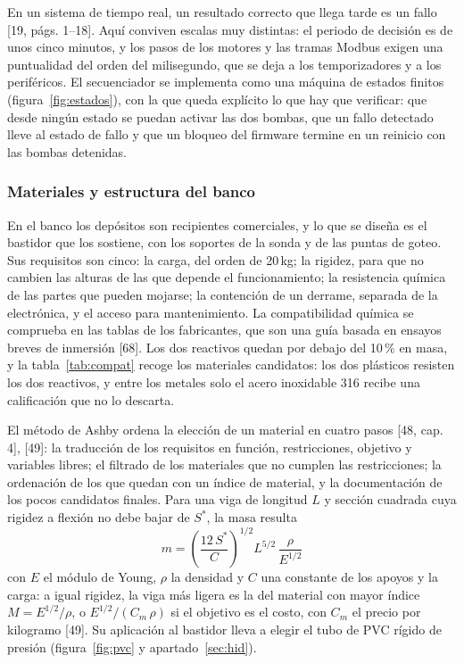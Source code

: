 
En un sistema de tiempo real, un resultado correcto que llega tarde es un fallo [19, págs. 1–18]. Aquí conviven escalas muy distintas: el periodo de decisión es de unos cinco minutos, y los pasos de los motores y las tramas Modbus exigen una puntualidad del orden del milisegundo, que se deja a los temporizadores y a los periféricos. El secuenciador se implementa como una máquina de estados finitos (figura~\ref{fig:estados}), con la que queda explícito lo que hay que verificar: que desde ningún estado se puedan activar las dos bombas, que un fallo detectado lleve al estado de fallo y que un bloqueo del firmware termine en un reinicio con las bombas detenidas.

\subsubsection{Materiales y estructura del banco}\label{sec:materiales}
En el banco los depósitos son recipientes comerciales, y lo que se diseña es el bastidor que los sostiene, con los soportes de la sonda y de las puntas de goteo. Sus requisitos son cinco: la carga, del orden de 20\,kg; la rigidez, para que no cambien las alturas de las que depende el funcionamiento; la resistencia química de las partes que pueden mojarse; la contención de un derrame, separada de la electrónica, y el acceso para mantenimiento. La compatibilidad química se comprueba en las tablas de los fabricantes, que son una guía basada en ensayos breves de inmersión [68]. Los dos reactivos quedan por debajo del 10\,\% en masa, y la tabla~\ref{tab:compat} recoge los materiales candidatos: los dos plásticos resisten los dos reactivos, y entre los metales solo el acero inoxidable 316 recibe una calificación que no lo descarta.


El método de Ashby ordena la elección de un material en cuatro pasos [48, cap. 4], [49]: la traducción de los requisitos en función, restricciones, objetivo y variables libres; el filtrado de los materiales que no cumplen las restricciones; la ordenación de los que quedan con un índice de material, y la documentación de los pocos candidatos finales. Para una viga de longitud $L$ y sección cuadrada cuya rigidez a flexión no debe bajar de $S^{*}$, la masa resulta
\begin{equation}
m=\left(\frac{12\,S^{*}}{C}\right)^{1/2}L^{5/2}\,\frac{\rho}{E^{1/2}}\label{eq:ashby}
\end{equation}
con $E$ el módulo de Young, $\rho$ la densidad y $C$ una constante de los apoyos y la carga: a igual rigidez, la viga más ligera es la del material con mayor índice $M=E^{1/2}/\rho$, o $E^{1/2}/(C_m\,\rho)$ si el objetivo es el costo, con $C_m$ el precio por kilogramo [49]. Su aplicación al bastidor lleva a elegir el tubo de PVC rígido de presión (figura~\ref{fig:pvc} y apartado~\ref{sec:hid}).

